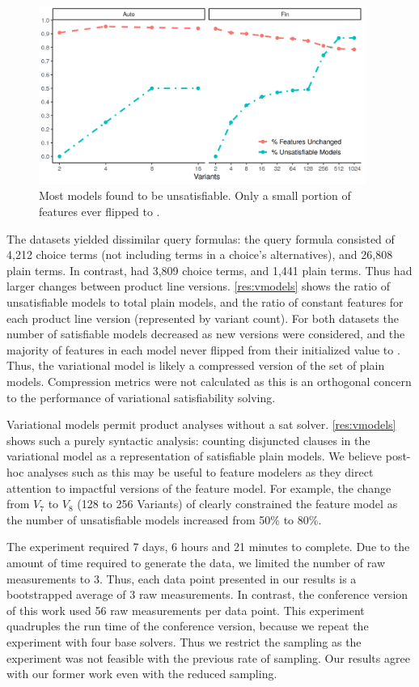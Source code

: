 \label{section:case-studies:results-and-discussion}
%
\begin{figure}
  \includegraphics[width=0.95\textwidth]{Plots/VModel}
  \caption{Most models found to be unsatisfiable. Only a small portion of
    features ever flipped to \tru.}%
  \label{res:vmodels}
\end{figure}
%
The datasets yielded dissimilar query formulas: the \auto{} query formula
consisted of 4,212 choice terms (not including terms in a choice's
alternatives), and 26,808 plain terms. In contrast, \fin{} had 3,809 choice
terms, and 1,441 plain terms. Thus \fin{} had larger changes between product
line versions. \autoref{res:vmodels} shows the ratio of unsatisfiable models to
total plain models, and the ratio of constant features for each product line
version (represented by variant count). For both datasets the number of
satisfiable models decreased as new versions were considered, and the majority
of features in each model never flipped from their initialized value \fls{} to
\tru{}. Thus, the variational model is likely a compressed version of the set
of plain models. Compression metrics were not calculated as this is an
orthogonal concern to the performance of variational satisfiability solving.

Variational models permit product analyses without a \ac{sat} solver.
\autoref{res:vmodels} shows such a purely syntactic analysis: counting
disjuncted clauses in the variational model as a representation of satisfiable
plain models. We believe post-hoc analyses such as this may be useful to feature
modelers as they direct attention to impactful versions of the feature model.
For example, the change from $V_{7}$ to $V_{8}$ (128 to 256 Variants) of \fin{}
clearly constrained the feature model as the number of unsatisfiable models
increased from 50\% to 80\%.

The experiment required 7 days, 6 hours and 21 minutes to complete. Due to the
amount of time required to generate the data, we limited the number of raw
measurements to 3. Thus, each data point presented in our results is a
bootstrapped average of 3 raw measurements. In contrast, the conference version
of this work used 56 raw measurements per data point. This experiment quadruples
the run time of the conference version, because we repeat the experiment with
four base solvers. Thus we restrict the sampling as the experiment was not
feasible with the previous rate of sampling. Our results agree with our former
work even with the reduced sampling.

